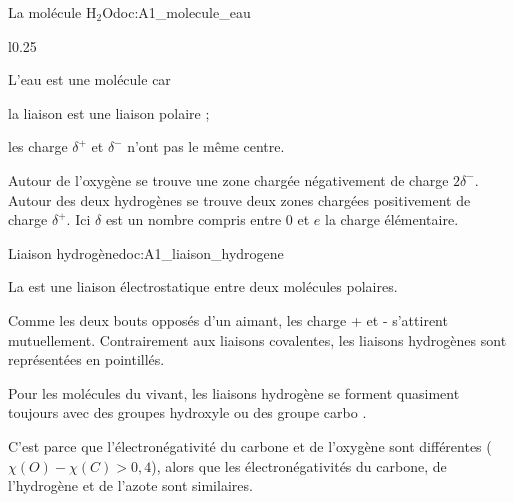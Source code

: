 \begin{doc}{La molécule H$_2$O}{doc:A1_molecule_eau} 
  \begin{wrapfigure}[3]{l}{0.25\linewidth}
    \centering
    \vspace*{-22pt}
  \end{wrapfigure}
  \phantom{b}\vspace*{-20pt}
    
  \begin{importants}
    L'eau est une molécule  car 
    \begin{listePoints}
      \item la liaison  est une liaison polaire ;
      \item les charge $\delta^+$ et $\delta^-$ n'ont pas le même centre.
    \end{listePoints}
  \end{importants}

  Autour de l'oxygène se trouve une zone chargée négativement de charge $2\delta^-$.
  Autour des deux hydrogènes se trouve deux zones chargées positivement de charge $\delta^+$.  
  Ici $\delta$ est un nombre compris entre $0$ et $e$ la charge élémentaire.
\end{doc}

\begin{doc}{Liaison hydrogène}{doc:A1_liaison_hydrogene}
  \begin{importants}
    La  est une liaison électrostatique entre deux molécules polaires.
  \end{importants}
  Comme les deux bouts opposés d'un aimant, les charge + et - s'attirent mutuellement.
  Contrairement aux liaisons covalentes, les liaisons hydrogènes sont représentées en pointillés.

  \begin{importants}  
    Pour les molécules du vivant, les liaisons hydrogène se forment quasiment toujours avec des groupes hydroxyle  ou des groupe carbo .
  \end{importants}
  C'est parce que l'électronégativité du carbone et de l'oxygène sont différentes
  ($\chi(O) - \chi(C) > 0,4$),
  alors que les électronégativités du carbone, de l'hydrogène et de l'azote sont similaires.
\end{doc}


